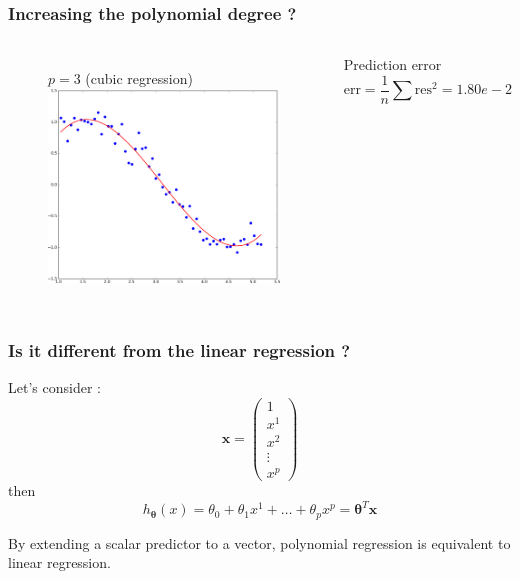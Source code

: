 \documentclass[handout, 10pt]{beamer}
\begin{document}
\begin{frame}
\frametitle{Increasing the polynomial degree ?}
\begin{columns}
\begin{figure}
$p=3$ (cubic regression)\\
\includegraphics[width=0.99\textwidth]{./linreg_pow3.png}
\end{figure}
\begin{block}{Prediction error}
$$
\text{err} = \frac{1}{n}\sum \text{res}^2 = 1.80e-2
$$
\end{block}
\end{columns}
\end{frame}


\begin{frame}
\frametitle{Is it different from the linear regression ?}
Let's consider :
$$
\bm{x} = 
\begin{pmatrix}
1 \\
x^1 \\
x^2 \\
\vdots \\
x^p
\end{pmatrix}
$$
then
$$
h_{\bm{\theta}}(x) = \theta_0  + \theta_1 x^1 + \ldots + \theta_p x^p = \bm{\theta}^T \bm{x}
$$
\begin{alertblock}{}
By extending a scalar predictor to a vector,
polynomial regression is equivalent to linear regression.
\end{alertblock}

\end{frame}
\end{document}
